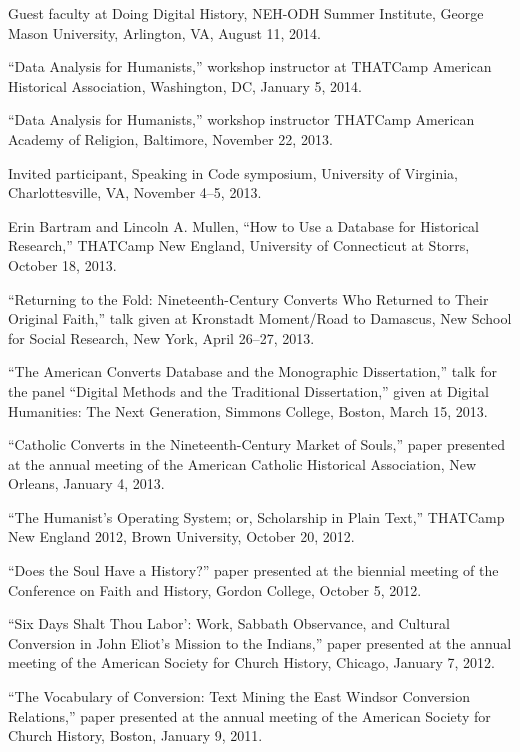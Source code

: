 \documentclass[11pt]{article}
\begin{document}
Guest faculty at Doing Digital History, NEH-ODH 
Summer Institute, George Mason University, Arlington, VA, August 11, 2014.

``Data Analysis for Humanists,'' workshop instructor at THATCamp American Historical Association, 
Washington, DC, January 5, 2014.

``Data Analysis for Humanists,'' workshop instructor THATCamp American Academy of Religion, Baltimore, November 22, 2013.

Invited participant, Speaking in Code symposium, University of Virginia, 
Charlottesville, VA, November 4--5, 2013.

Erin Bartram and Lincoln A. Mullen, ``How to Use a Database for Historical 
Research,'' THATCamp New England, University of Connecticut at Storrs, October 
18, 2013.

``Returning to the Fold: Nineteenth-Century Converts Who Returned to
Their Original Faith,'' talk given at Kronstadt Moment/Road to Damascus,
New School for Social Research, New York, April 26--27, 2013.

``The American Converts Database and the Monographic Dissertation,''
talk for the panel ``Digital Methods and the Traditional Dissertation,''
given at Digital Humanities: The Next Generation, Simmons College,
Boston, March 15, 2013.

``Catholic Converts in the Nineteenth-Century Market of Souls,'' paper
presented at the annual meeting of the American Catholic Historical
Association, New Orleans, January 4, 2013.

``The Humanist's Operating System; or, Scholarship in Plain Text,'' THATCamp 
New England 2012, Brown University, October 20, 2012.

``Does the Soul Have a History?'' paper presented at the biennial
meeting of the Conference on Faith and History, Gordon College, October
5, 2012.

``Six Days Shalt Thou Labor': Work, Sabbath Observance, and Cultural
Conversion in John Eliot's Mission to the Indians,'' paper presented at
the annual meeting of the American Society for Church History, Chicago,
January 7, 2012.

``The Vocabulary of Conversion: Text Mining the East Windsor Conversion
Relations,'' paper presented at the annual meeting of the American
Society for Church History, Boston, January 9, 2011.

\end{document}
